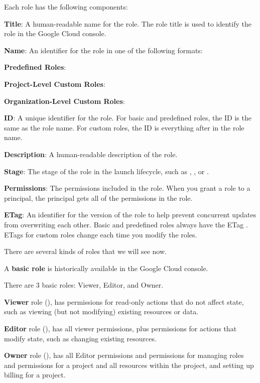 Each role has the following components:
\bit
\item \textbf{Title}: A human-readable name for the role. The role title is used to identify the role in the Google
Cloud console.
\item \textbf{Name}: An identifier for the role in one of the following formats:
\bit
\item \textbf{Predefined Roles}: 
\item \textbf{Project-Level Custom Roles}: 
\item \textbf{Organization-Level Custom Roles}: 
\eit
\item \textbf{ID}: A unique identifier for the role. For basic and predefined roles, the ID is the same as the role
name. For custom roles, the ID is everything after  in the role name.
\item \textbf{Description}: A human-readable description of the role.
\item \textbf{Stage}: The stage of the role in the launch lifecycle, such as , , or .
\item \textbf{Permissions}: The permissions included in the role. When you grant a role to a principal, the principal
gets all of the permissions in the role.
\item \textbf{ETag}: An identifier for the version of the role to help prevent concurrent updates from overwriting each
other. Basic and predefined roles always have the ETag . ETags for custom roles change each time you modify
the roles.
\eit

There are several kinds of roles that we will see now.

A \textbf{basic role} is historically available in the Google Cloud console.
\ed

There are 3 basic roles: Viewer, Editor, and Owner.

\bd[Viewer]
\textbf{Viewer} role (), has permissions for read-only actions that do not affect state, such as
viewing (but not modifying) existing resources or data.
\ed

\bd[Editor]
\textbf{Editor} role (), has all viewer permissions, plus permissions for actions that modify
state, such as changing existing resources.
\ed

\bd[Owner]
\textbf{Owner} role (), has all Editor permissions and permissions for managing roles and permissions
for a project and all resources within the project, and setting up billing for a project.
\ed

